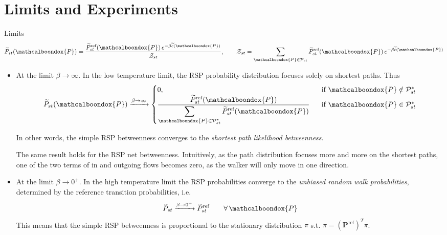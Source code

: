\documentclass[13pt]{beamer}
\newcommand{\bondox}{\mathcalboondox}
\begin{document}
    \section{Limits and Experiments}

    \begin{frame}[t,allowframebreaks]{Limits}
    \begin{equation*}
    \widetilde{P}_{st}(\bondox{P})=\frac{\widetilde{P}_{st}^{\text{ref}}(\bondox{P})\,e^{-\beta\widetilde{c}(\bondox{P})}}{\mathcal{Z}_{st}},\qquad 
    \mathcal{Z}_{st}=\sum_{\bondox{P}\in \mathcal{P}_{st}}\widetilde{P}_{st}^{\text{ref}}(\bondox{P})\,e^{-\beta\widetilde{c}(\bondox{P})}
    \end{equation*}
    
    \begin{itemize}
        \item At the limit $\beta\to\infty$. In the low temperature limit, the RSP probability distribution focuses solely on shortest paths. Thus 
        \begin{equation*}
        \widetilde{P}_{st}(\bondox{P})\xrightarrow{\beta\to\infty}\begin{cases}
            0, &\ \text{ if }\bondox{P}\notin \mathcal{P}^*_{st}\\
            \dfrac{\widetilde{P}_{st}^{\text{ref}}(\bondox{P})}{\displaystyle \sum_{\bondox{P}\in\mathcal{P}^*_{st}} \widetilde{P}_{st}^{\text{ref}}(\bondox{P})} &\ \text{ if }\bondox{P}\in \mathcal{P}^*_{st}
        \end{cases}
        \end{equation*}

        In other words, the simple RSP  betweenness converges to the \emph{shortest path likelihood betweenness}.

        The same result holds for the RSP net betweenness. Intuitively, as the path distribution focuses more and more on the shortest paths, one of the two terms of in and outgoing flows becomes zero, as the walker will only move in one direction.

        \item At the limit $\beta\to0^+$. In the high temperature limit the RSP probabilities converge to the \emph{unbiased random walk probabilities}, determined by the reference transition probabilities, i.e.
        \begin{equation*}
        \widetilde{P}_{st} \xrightarrow{\beta\to0^+}\widetilde{P}_{st}^{\text{ref}}\qquad\forall\, \bondox{P}
        \end{equation*}
        This means that the simple RSP betweenness is proportional to the stationary distribution $\pi$ s.t. $\pi=\left( \mathbf{P}^\text{ref} \right)^T\pi$.
    \end{itemize}

    \end{frame}
\end{document}
